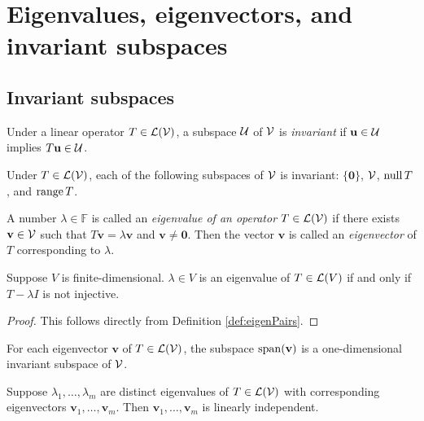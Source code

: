 \section{Eigenvalues, eigenvectors, and invariant subspaces}
\label{sec:eigenv-eigenv-invar}

\subsection{Invariant subspaces}

\begin{defn}
  \label{def:invariantSubspace}
  Under a linear operator $T\in {\cal L}({\cal V})$,
  a subspace ${\cal U}$ of ${\cal V}$ is \emph{invariant}
  if $\mathbf{u}\in {\cal U}$ implies $T \mathbf{u}\in {\cal U}$.
\end{defn}

\begin{exm}
  Under $T\in {\cal L}({\cal V})$,
  each of the following subspaces of ${\cal V}$
  is invariant:
  $\{\mathbf{0}\}$, ${\cal V}$,
  $\mathrm{null}\, T$, and $\mathrm{range}\, T$.
\end{exm}

\begin{defn}
  \label{def:eigenPairs}
  A number $\lambda\in \mathbb{F}$
  is called an \emph{eigenvalue of an operator}
  $T\in {\cal L}({\cal V})$ if
  there exists $\mathbf{v}\in {\cal V}$ such that
  $T \mathbf{v} = \lambda \mathbf{v}$
  and $\mathbf{v}\ne \mathbf{0}$.
  Then the vector $\mathbf{v}$ is called an \emph{eigenvector}
  of $T$ corresponding to $\lambda$.
\end{defn}

\begin{lem}
  \label{lem:eigenValMakesTmlINotInjective}
  Suppose $V$ is finite-dimensional.
  $\lambda\in V$ is an eigenvalue of $T\in {\cal L}(V)$
  if and only if $T-\lambda I$ is not injective.
\end{lem}
\begin{proof}
  This follows directly from Definition \ref{def:eigenPairs}.
\end{proof}

\begin{exm}
  For each eigenvector $\mathbf{v}$ of $T\in {\cal L}({\cal V})$,
  the subspace $\mathrm{span}(\mathbf{v})$ is a one-dimensional
  invariant subspace of ${\cal V}$.
\end{exm}

\begin{lem}
  \label{lem:distinctEigenValImpliesIndependentEigenVec}
  Suppose $\lambda_1, \ldots, \lambda_m$ are distinct eigenvalues
  of $T\in {\cal L}({\cal V})$
  with corresponding eigenvectors $\mathbf{v}_1, \ldots, \mathbf{v}_m$.
  Then $\mathbf{v}_1, \ldots, \mathbf{v}_m$ is linearly independent.
\end{lem}

